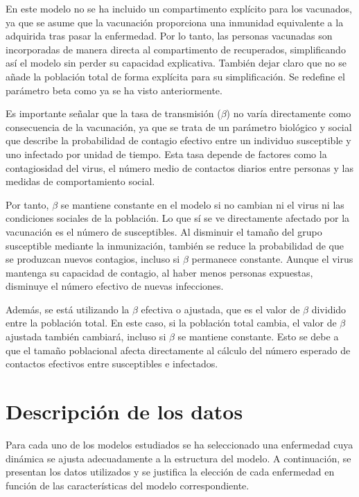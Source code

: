 En este modelo no se ha incluido un compartimento explícito para los vacunados, ya que se asume que la vacunación proporciona una inmunidad equivalente a la adquirida tras pasar la enfermedad. Por lo tanto, las personas vacunadas son incorporadas de manera directa al compartimento de recuperados, simplificando así el modelo sin perder su capacidad explicativa. También dejar claro que no se añade la población total de forma explícita para su simplificación. Se redefine el parámetro beta como ya se ha visto anteriormente.

Es importante señalar que la tasa de transmisión ($\beta$) no varía directamente como consecuencia de la vacunación, ya que se trata de un parámetro biológico y social que describe la probabilidad de contagio efectivo entre un individuo susceptible y uno infectado por unidad de tiempo. Esta tasa depende de factores como la contagiosidad del virus, el número medio de contactos diarios entre personas y las medidas de comportamiento social.

Por tanto, $\beta$ se mantiene constante en el modelo si no cambian ni el virus ni las condiciones sociales de la población. Lo que sí se ve directamente afectado por la vacunación es el número de susceptibles. Al disminuir el tamaño del grupo susceptible mediante la inmunización, también se reduce la probabilidad de que se produzcan nuevos contagios, incluso si $\beta$ permanece constante. Aunque el virus mantenga su capacidad de contagio, al haber menos personas expuestas, disminuye el número efectivo de nuevas infecciones.

Además, se está utilizando la $\beta$ efectiva o ajustada, que es el valor de $\beta$ dividido entre la población total. En este caso, si la población total cambia, el valor de $\beta$ ajustada también cambiará, incluso si $\beta$ se mantiene constante. Esto se debe a que el tamaño poblacional afecta directamente al cálculo del número esperado de contactos efectivos entre susceptibles e infectados.

















\section{Descripción de los datos}
Para cada uno de los modelos estudiados se ha seleccionado una enfermedad cuya dinámica se ajusta adecuadamente a la estructura del modelo. A continuación, se presentan los datos utilizados y se justifica la elección de cada enfermedad en función de las características del modelo correspondiente.

